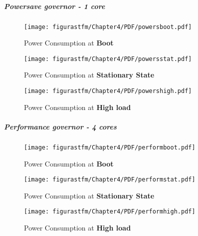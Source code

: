 \subparagraph{\textit{Powersave} governor - 1 core}



\begin{figure} [H]
			\centering
			\texttt{[image: figurastfm/Chapter4/PDF/powersboot.pdf]}
			\caption{Power Consumption at \textbf{Boot}} %
			\vspace{-1cm}
\end{figure}

\begin{figure} [H]
			\centering
			\texttt{[image: figurastfm/Chapter4/PDF/powersstat.pdf]}
			\caption{Power Consumption at \textbf{Stationary State}} %
			\vspace{-2cm}
\end{figure}


\begin{figure} [H]
			\centering
			\texttt{[image: figurastfm/Chapter4/PDF/powershigh.pdf]}
			\caption{Power Consumption at \textbf{High load}} %
			\vspace{-0.5cm}
\end{figure}

\subparagraph{\textit{Performance} governor - 4 cores}


\begin{figure} [H]
			\centering
			\texttt{[image: figurastfm/Chapter4/PDF/performboot.pdf]}
			\caption{Power Consumption at \textbf{Boot}} %
			\vspace{-2cm}
\end{figure}

\begin{figure} [H]
			\centering
			\texttt{[image: figurastfm/Chapter4/PDF/performstat.pdf]}
			\caption{Power Consumption at \textbf{Stationary State}} %
\end{figure}


\begin{figure} [H]
			\centering
			\texttt{[image: figurastfm/Chapter4/PDF/performhigh.pdf]}
			\caption{Power Consumption at \textbf{High load}} %
			\vspace{-2cm}
\end{figure}

